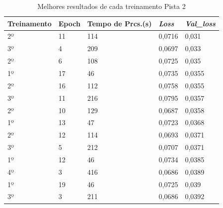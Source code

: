 \begin{table}[H]
\centering
\caption{Melhores resultados de cada treinamento Pista 2}
\label{tabela3}
\begin{tabular}{|l|l|l|l|l|}
\hline
\textbf{Treinamento} & \textbf{Epoch} & \textbf{Tempo de Prcs.(s)} & \textit{\textbf{Loss}} & \textit{\textbf{Val\_loss}} \\ \hline
2º                   & 11             & 114                        & 0,0716                 & 0,031                       \\
3º                   & 4              & 209                        & 0,0697                 & 0,033                       \\
2º                   & 6              & 108                        & 0,0725                 & 0,035                       \\
1º                   & 17             & 46                         & 0,0735                 & 0,0355                      \\
2º                   & 16             & 112                        & 0,0758                 & 0,0355                      \\
3º                   & 11             & 216                        & 0,0795                 & 0,0357                      \\
2º                   & 10             & 129                        & 0,0687                 & 0,0358                      \\
1º                   & 13             & 47                         & 0,0723                 & 0,0368                      \\
2º                   & 12             & 114                        & 0,0693                 & 0,0371                      \\
3º                   & 5              & 212                        & 0,0707                 & 0,0371                      \\
1º                   & 12             & 46                         & 0,0734                 & 0,0385                      \\
4º                   & 3              & 416                        & 0,0686                 & 0,0389                      \\
1º                   & 19             & 46                         & 0,0725                 & 0,039                       \\
3º                   & 3              & 211                        & 0,0686                 & 0,0392                      \\

\end{tabular}
\end{table}
